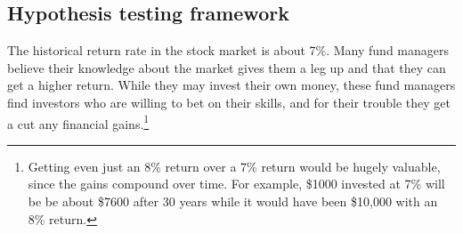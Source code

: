 




\subsection{Hypothesis testing framework}

%


The historical return rate in the stock market is about 7\%.
Many fund managers believe their knowledge about the market gives
them a leg up and that they can get a higher return. While
they may invest their own money, these fund managers
find investors who are willing to bet on their skills,
and for their trouble they get a cut any financial
gains.\footnote{Getting even just an 8\% return over a 7\%
return would be hugely valuable, since the gains compound over
time. For example, \$1000 invested at 7\% will be be about
\$7600 after 30 years while it would have been \$10,000 with
an 8\% return.}

